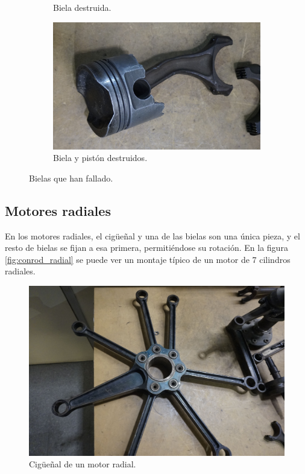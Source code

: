 \begin{figure}[H]
\begin{subfigure}[b]{0.45\textwidth}
		\caption{Biela destruida.}
		\label{fig:broken}
	\end{subfigure}
	\hfill
	\begin{subfigure}[b]{0.45\textwidth}
 		\centering
 		\includegraphics[width=\linewidth]{Figures/02/m4/damage.jpg}
 		\caption{Biela y pistón destruidos.}
		\label{fig:broken_w_p}
	\end{subfigure}    
	\caption{Bielas que han fallado.}
	\label{fig:broken_conrod}
\end{figure}

\subsection{Motores radiales} \label{ss:radial_conrod}

En los motores radiales, el cigüeñal y una de las bielas son una única pieza, y el resto de bielas se fijan a esa primera, permitiéndose su rotación. En la figura \ref{fig:conrod_radial} se puede ver un montaje típico de un motor de 7 cilindros radiales.

\begin{figure}[H]
	\centering
	\includegraphics[width=0.6\linewidth]{Figures/02/m4/cig_radial.jpg}
	\caption{Cigüeñal de un motor radial.}
	\label{fig:conrod}
\end{figure}






